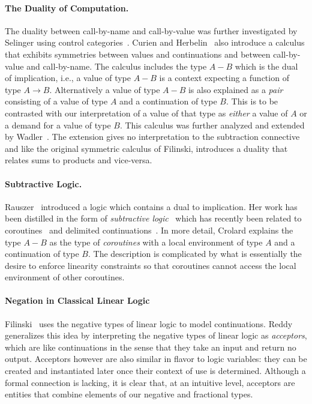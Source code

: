 \documentclass[preprint]{sigplanconf}
\begin{document}
\paragraph*{The Duality of Computation.}
The duality between call-by-name and call-by-value was further investigated
by Selinger using control
categories~\cite{Selinger:2001:CCD:966910.966911}. Curien and
Herbelin~\cite{Curien:2000} also introduce a calculus that exhibits
symmetries between values and continuations and between call-by-value and
call-by-name. The calculus includes the type $A-B$ which is the dual of
implication, i.e., a value of type $A-B$ is a context expecting a function of
type $A \rightarrow B$. Alternatively a value of type $A-B$ is also explained
as a \emph{pair} consisting of a value of type $A$ and a continuation of type
$B$. This is to be contrasted with our interpretation of a value of that type
as \emph{either} a value of $A$ or a demand for a value of type $B$. This
calculus was further analyzed and extended by
Wadler~\cite{Wadler:2003,DBLP:conf/rta/Wadler05}. The extension gives no
interpretation to the subtraction connective and like the original symmetric
calculus of Filinski, introduces a duality that relates sums to products and
vice-versa.

\paragraph*{Subtractive Logic.} 
Rauszer~\cite{springerlink:10.1007/BF02120864,rauszer,rauszer2} introduced a
logic which contains a dual to implication. Her work has been distilled in
the form of \emph{subtractive logic}~\cite{Crolard01} which has recently been
related to coroutines~\cite{Crolard01082004} and delimited
continuations~\cite{Ariola:2009:TFD:1743339.1743381}.  In more detail,
Crolard explains the type $A-B$ as the type of \emph{coroutines} with a local
environment of type $A$ and a continuation of type $B$. The description is
complicated by what is essentially the desire to enforce linearity
constraints so that coroutines cannot access the local environment of other
coroutines. 

\paragraph*{Negation in Classical Linear Logic} 
Filinski~\cite{Filinski92} uses the negative types of linear logic to model
continuations. Reddy~\cite{Reddy91} generalizes this idea by interpreting the
negative types of linear logic as \emph{acceptors}, which are like
continuations in the sense that they take an input and return no
output. Acceptors however are also similar in flavor to logic variables:
they can be created and instantiated later once their context of use is
determined. Although a formal connection is lacking, it is clear that, at an
intuitive level, acceptors are entities that combine elements of our negative
and fractional types.
\end{document}
